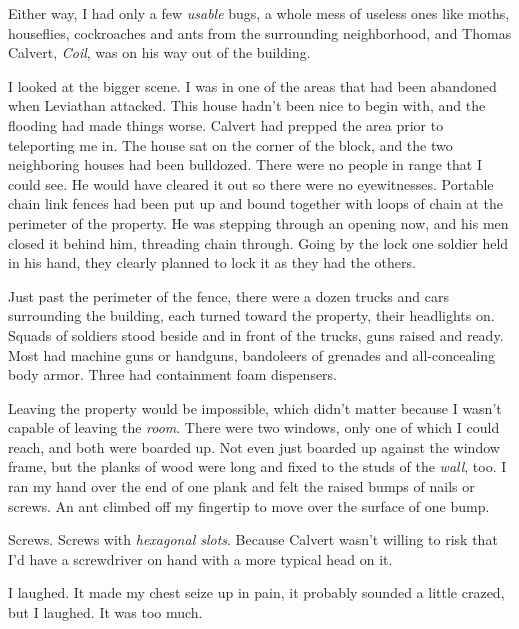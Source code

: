 Either way, I had only a few \emph{usable} bugs, a whole mess of useless ones like moths, houseflies, cockroaches and ants from the surrounding neighborhood, and Thomas Calvert, \emph{Coil}, was on his way out of the building.



I looked at the bigger scene.  I was in one of the areas that had been abandoned when Leviathan attacked.  This house hadn't been nice to begin with, and the flooding had made things worse.  Calvert had prepped the area prior to teleporting me in.  The house sat on the corner of the block, and the two neighboring houses had been bulldozed.  There were no people in range that I could see.  He would have cleared it out so there were no eyewitnesses.  Portable chain link fences had been put up and bound together with loops of chain at the perimeter of the property.  He was stepping through an opening now, and his men closed it behind him, threading chain through.  Going by the lock one soldier held in his hand, they clearly planned to lock it as they had the others.



Just past the perimeter of the fence, there were a dozen trucks and cars surrounding the building, each turned toward the property, their headlights on.  Squads of soldiers stood beside and in front of the trucks, guns raised and ready.  Most had machine guns or handguns, bandoleers of grenades and all-concealing body armor.  Three had containment foam dispensers.



Leaving the property would be impossible, which didn't matter because I wasn't capable of leaving the \emph{room}.  There were two windows, only one of which I could reach, and both were boarded up.  Not even just boarded up against the window frame, but the planks of wood were long and fixed to the studs of the \emph{wall}, too.  I ran my hand over the end of one plank and felt the raised bumps of nails or screws.  An ant climbed off my fingertip to move over the surface of one bump.



Screws.  Screws with \emph{hexagonal slots}.  Because Calvert wasn't willing to risk that I'd have a screwdriver on hand with a more typical head on it.



I laughed.  It made my chest seize up in pain, it probably sounded a little crazed, but I laughed.  It was too much.



